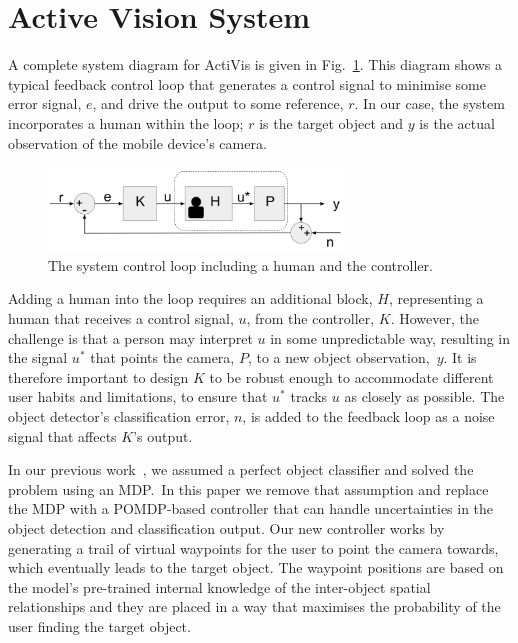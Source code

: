 \documentclass[runningheads]{llncs}
\begin{document}
\section{Active Vision System}\label{sec:active-vision}

A complete system diagram for ActiVis is given in Fig.~\ref{fig:sys-diagram}. 
This diagram shows a typical feedback control loop that generates a control signal to minimise some error signal, $e$, and drive the output to some reference, $r$. In our case, the system incorporates a human within the loop; $r$ is the target object and $y$ is the actual observation of the mobile device's camera.

\begin{figure}[t]
  \centering
  \includegraphics[width=0.7\textwidth]{figures/control_loop.png}
  \caption{The system control loop including a human and the controller.}\label{fig:sys-diagram}
\end{figure}

Adding a human into the loop requires an additional block, $H$, representing a human that receives a control signal, $u$, from the controller, $K$. 
However, the challenge is that a person may interpret $u$ in some unpredictable way, resulting in the signal $u^*$ that points the camera, $P$, to a new object observation,~$y$.
It is therefore important to design $K$ to be robust enough to accommodate different user habits and limitations, to ensure that $u^*$ tracks $u$ as closely as possible. 
The object detector's classification error, $n$, is added to the feedback loop as a noise signal that affects $K$'s output.

In our previous work~\cite{lock2019active}, we assumed a perfect object classifier and solved the problem using an MDP.\
In this paper we remove that assumption and replace the MDP with a POMDP-based controller that can handle uncertainties in the object detection and classification output. 
Our new controller works by generating a trail of virtual waypoints for the user to point the camera towards, which eventually leads to the target object.
The waypoint positions are based on the model's pre-trained internal knowledge of the inter-object spatial relationships and they are placed in a way that maximises the probability of the user finding the target object.
\end{document}
